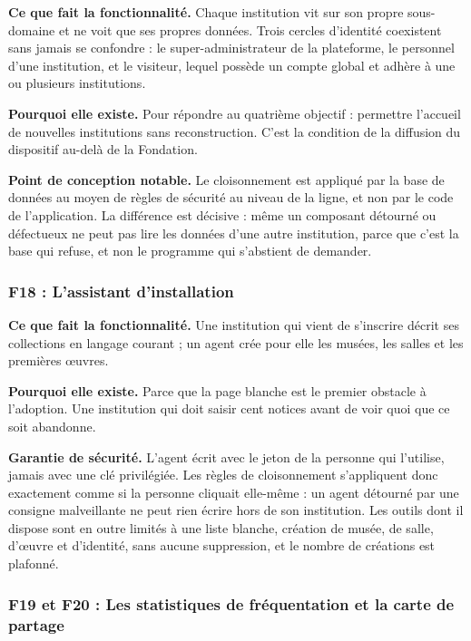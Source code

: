 \textbf{Ce que fait la fonctionnalité.} Chaque institution vit sur son propre
sous-domaine et ne voit que ses propres données. Trois cercles d'identité
coexistent sans jamais se confondre : le super-administrateur de la plateforme,
le personnel d'une institution, et le visiteur, lequel possède un compte global
et adhère à une ou plusieurs institutions.

\textbf{Pourquoi elle existe.} Pour répondre au quatrième objectif : permettre
l'accueil de nouvelles institutions sans reconstruction. C'est la condition de
la diffusion du dispositif au-delà de la Fondation.

\textbf{Point de conception notable.} Le cloisonnement est appliqué par la base
de données au moyen de règles de sécurité au niveau de la ligne, et non par le
code de l'application. La différence est décisive : même un composant détourné
ou défectueux ne peut pas lire les données d'une autre institution, parce que
c'est la base qui refuse, et non le programme qui s'abstient de demander.

\subsubsection{F18 : L'assistant d'installation}

\textbf{Ce que fait la fonctionnalité.} Une institution qui vient de s'inscrire
décrit ses collections en langage courant ; un agent crée pour elle les musées,
les salles et les premières œuvres.

\textbf{Pourquoi elle existe.} Parce que la page blanche est le premier obstacle
à l'adoption. Une institution qui doit saisir cent notices avant de voir quoi
que ce soit abandonne.

\textbf{Garantie de sécurité.} L'agent écrit avec le jeton de la personne qui
l'utilise, jamais avec une clé privilégiée. Les règles de cloisonnement
s'appliquent donc exactement comme si la personne cliquait elle-même : un agent
détourné par une consigne malveillante ne peut rien écrire hors de son
institution. Les outils dont il dispose sont en outre limités à une liste
blanche, création de musée, de salle, d'œuvre et d'identité, sans aucune
suppression, et le nombre de créations est plafonné.

\subsubsection{F19 et F20 : Les statistiques de fréquentation et la carte de partage}

